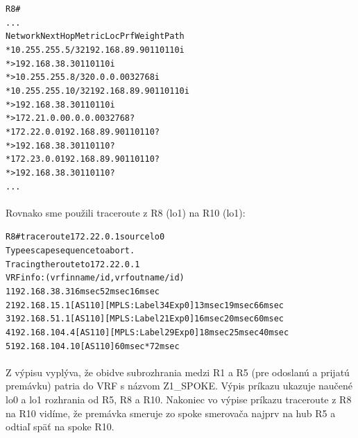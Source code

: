 \documentclass[12pt,twoside,a4paper]{report}
\begin{document}
\noindent
{\selectfont
\begin{small}
\begin{alltt}
R8#
...
     Network          Next Hop            Metric LocPrf Weight Path
 *   10.255.255.5/32  192.168.89.9                           0 110 110 i
 *>                   192.168.38.3                           0 110 110 i
 *>  10.255.255.8/32  0.0.0.0                  0         32768 i
 *   10.255.255.10/32 192.168.89.9                           0 110 110 i
 *>                   192.168.38.3                           0 110 110 i
 *>  172.21.0.0       0.0.0.0                  0         32768 ?
 *   172.22.0.0       192.168.89.9                           0 110 110 ?
 *>                   192.168.38.3                           0 110 110 ?
 *   172.23.0.0       192.168.89.9                           0 110 110 ?
 *>                   192.168.38.3                           0 110 110 ?
...
\end{alltt}
\end{small}
}

\paragraph{}
Rovnako sme použili traceroute z R8 (lo1) na R10 (lo1):

\noindent
{\selectfont
\begin{small}
\begin{alltt}
R8#traceroute 172.22.0.1 source lo0       
Type escape sequence to abort.
Tracing the route to 172.22.0.1
VRF info: (vrf in name/id, vrf out name/id)
  1 192.168.38.3 16 msec 52 msec 16 msec
  2 192.168.15.1 [AS 110] [MPLS: Label 34 Exp 0] 13 msec 19 msec 66 msec
  3 192.168.51.1 [AS 110] [MPLS: Label 21 Exp 0] 16 msec 20 msec 60 msec
  4 192.168.104.4 [AS 110] [MPLS: Label 29 Exp 0] 18 msec 25 msec 40 msec
  5 192.168.104.10 [AS 110] 60 msec *  72 msec
\end{alltt}
\end{small}
}

\paragraph{}
Z výpisu  vyplýva, že obidve subrozhrania medzi R1 a R5 (pre odoslanú a prijatú premávku) patria do VRF s názvom Z1\_SPOKE. Výpis príkazu  ukazuje naučené lo0 a lo1 rozhrania od R5, R8 a R10. Nakoniec vo výpise príkazu traceroute z R8 na R10 vidíme, že premávka smeruje zo spoke smerovača najprv na hub R5 a odtiaľ späť na spoke R10.
\end{document}
